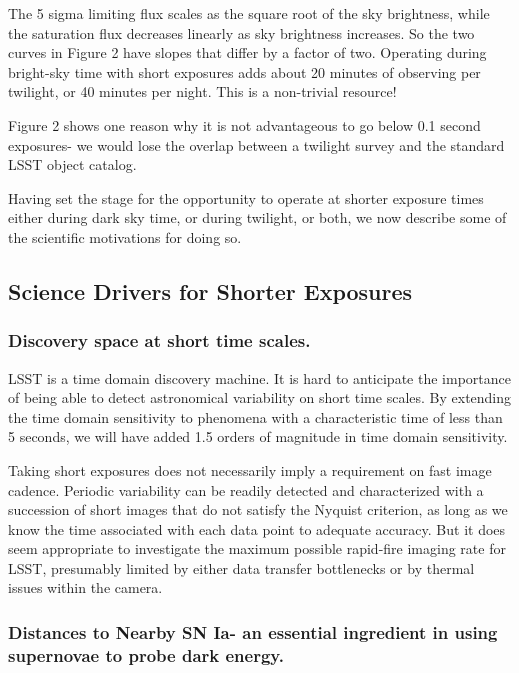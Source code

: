 The 5 sigma limiting flux scales as the square root of the sky brightness, while the saturation flux decreases linearly as sky brightness increases. So the two curves in Figure 2 have slopes that differ by a factor of two. Operating during bright-sky time with short exposures adds about 20 minutes of observing per twilight, or 40 minutes per night. This is a non-trivial resource!

Figure 2 shows one reason why it is not advantageous to go below 0.1 second exposures- we would lose the overlap between a twilight survey and the standard LSST object catalog. 

Having set the stage for the opportunity to operate at shorter exposure times either during dark sky time, or during twilight, or both, we now describe some of the scientific motivations for doing so. 

\subsection{Science Drivers for Shorter Exposures}

\subsubsection{Discovery space at short time scales.} 

LSST is a time domain discovery machine. It is hard to anticipate the importance of being able to detect astronomical variability on short time scales. By extending the time domain sensitivity to phenomena with a characteristic time of less than 5 seconds, we will have added 1.5 orders of magnitude in time domain sensitivity. 

Taking short exposures does not necessarily imply a requirement on fast image cadence. Periodic variability can be readily detected and characterized with a succession of short images that do not satisfy the Nyquist criterion, as long as we know the time associated with each data point to adequate accuracy. But it does seem appropriate to investigate the maximum possible rapid-fire imaging rate for LSST, presumably limited by either data transfer bottlenecks or by thermal issues within the camera. 

\subsubsection{Distances to Nearby SN Ia- an essential ingredient in using supernovae to probe dark energy.}

